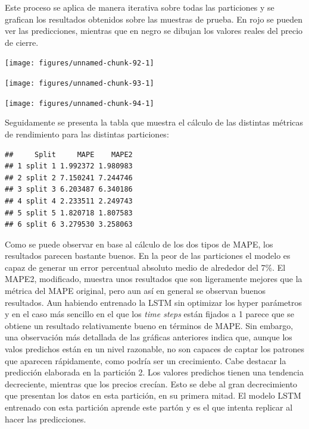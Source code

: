 \documentclass[]{DissertateUSU}
\begin{document}
\noindent Este proceso se aplica de manera iterativa sobre todas las
particiones y se grafican los resultados obtenidos sobre las muestras de
prueba. En rojo se pueden ver las predicciones, mientras que en negro se
dibujan los valores reales del precio de cierre.

\begin{center}\texttt{[image: figures/unnamed-chunk-92-1]} \end{center}
\centering

\setlength\parskip{5ex}
\justifying

\begin{center}\texttt{[image: figures/unnamed-chunk-93-1]} \end{center}
\centering

\setlength\parskip{5ex}
\justifying

\begin{center}\texttt{[image: figures/unnamed-chunk-94-1]} \end{center}
\centering

\setlength\parskip{5ex}
\justifying

\noindent Seguidamente se presenta la tabla que muestra el cálculo de
las distintas métricas de rendimiento para las distintas particiones:

\begin{verbatim}
##     Split     MAPE    MAPE2
## 1 split 1 1.992372 1.980983
## 2 split 2 7.150241 7.244746
## 3 split 3 6.203487 6.340186
## 4 split 4 2.233511 2.249743
## 5 split 5 1.820718 1.807583
## 6 split 6 3.279530 3.258063
\end{verbatim}

\noindent Como se puede observar en base al cálculo de los dos tipos de
MAPE, los resultados parecen bastante buenos. En la peor de las
particiones el modelo es capaz de generar un error percentual absoluto
medio de alrededor del 7\%. El MAPE2, modificado, muestra unos
resultados que son ligeramente mejores que la métrica del MAPE original,
pero aun así en general se observan buenos resultados. Aun habiendo
entrenado la LSTM sin optimizar los hyper parámetros y en el caso más
sencillo en el que los \emph{time steps} están fijados a 1 parece que se
obtiene un resultado relativamente bueno en términos de MAPE. Sin
embargo, una observación más detallada de las gráficas anteriores indica
que, aunque los valos predichos están en un nivel razonable, no son
capaces de captar los patrones que aparecen rápidamente, como podría ser
un crecimiento. Cabe destacar la predicción elaborada en la partición 2.
Los valores predichos tienen una tendencia decreciente, mientras que los
precios crecían. Esto se debe al gran decrecimiento que presentan los
datos en esta partición, en su primera mitad. El modelo LSTM entrenado
con esta partición aprende este partón y es el que intenta replicar al
hacer las predicciones.
\end{document}
